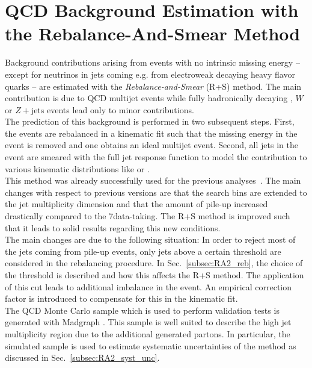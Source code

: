 \section{QCD Background Estimation with the Rebalance-And-Smear Method}
\label{subsec:RA2_QCD}
Background contributions arising from events with no intrinsic missing energy -- except for neutrinos in jets coming e.g. from electroweak decaying heavy flavor quarks -- are estimated with the 
\textit{Rebalance-and-Smear} (R+S) method. The main contribution is due to QCD multijet events while fully hadronically decaying \ttbar, $W$ or $Z+ \mathrm{jets}$ events lead only to minor contributions. \\
The prediction of this background is performed in two subsequent steps. First, the events are rebalanced in a kinematic fit such that the missing energy in the event is removed and one obtains an ideal multijet event. Second, all jets in the event are smeared with the full jet response function to model the contribution to various kinematic distributions like \HT or \MHT. \\
This method was already successfully used for the previous analyses~\cite{springerlink:10.1007/JHEP08(2011)155, Chatrchyan:2012lia}. The main changes with respect to previous versions are that the search bins are extended to the jet multiplicity dimension and that the amount of pile-up increased drastically compared to the 7\tev data-taking. The R+S method is improved such that it leads to solid results regarding this new conditions. \\
The main changes are due to the following situation: In order to reject most of the jets coming from pile-up events, only jets above a certain \pt threshold are considered in the rebalancing procedure. In Sec.~\ref{subsec:RA2_reb}, the choice of the \pt threshold is described and how this affects the R+S method. The application of this \pt cut leads to additional imbalance in the event. An empirical correction factor is introduced to compensate for this in the kinematic fit.\\
The QCD Monte Carlo sample which is used \eg to perform validation tests is generated with Madgraph . This sample is well suited to describe the high jet multiplicity region due to the additional generated partons. In particular, the simulated sample is used to estimate systematic uncertainties of the method as discussed in Sec.~\ref{subsec:RA2_syst_unc}. 

